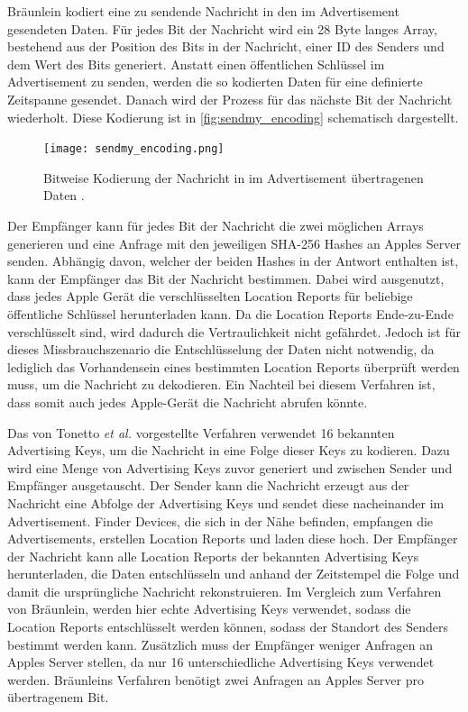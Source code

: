 Bräunlein \cite{braeunlein_sendmy} kodiert eine zu sendende Nachricht in den im Advertisement gesendeten Daten.
Für jedes Bit der Nachricht wird ein 28 Byte langes Array, bestehend aus der Position des Bits in der Nachricht, einer ID des Senders und dem Wert des Bits generiert.
Anstatt einen öffentlichen Schlüssel im Advertisement zu senden, werden die so kodierten Daten für eine definierte Zeitspanne gesendet.
Danach wird der Prozess für das nächste Bit der Nachricht wiederholt.
Diese Kodierung ist in \autoref{fig:sendmy_encoding} schematisch dargestellt.
\begin{figure}[ht]
  \centering
  \texttt{[image: sendmy\_encoding.png]}
  \caption{Bitweise Kodierung der Nachricht in im Advertisement übertragenen Daten \cite{braeunlein_sendmy}.}
  \label{fig:sendmy_encoding}
\end{figure}
Der Empfänger kann für jedes Bit der Nachricht die zwei möglichen Arrays generieren und eine Anfrage mit den jeweiligen \ac{SHA}-256 Hashes an Apples Server senden.
Abhängig davon, welcher der beiden Hashes in der Antwort enthalten ist, kann der Empfänger das Bit der Nachricht bestimmen.
Dabei wird ausgenutzt, dass jedes Apple Gerät die verschlüsselten Location Reports für beliebige öffentliche Schlüssel herunterladen kann.
Da die Location Reports Ende-zu-Ende verschlüsselt sind, wird dadurch die Vertraulichkeit nicht gefährdet.
Jedoch ist für dieses Missbrauchszenario die Entschlüsselung der Daten nicht notwendig, da lediglich das Vorhandensein eines bestimmten Location Reports überprüft werden muss, um die Nachricht zu dekodieren.
Ein Nachteil bei diesem Verfahren ist, dass somit auch jedes Apple-Gerät die Nachricht abrufen könnte.


Das von Tonetto \textit{et al.} \cite{Tonetto_FindMy} vorgestellte Verfahren verwendet 16 bekannten Advertising Keys, um die Nachricht in eine Folge dieser Keys zu kodieren.
Dazu wird eine Menge von Advertising Keys zuvor generiert und zwischen Sender und Empfänger ausgetauscht.
Der Sender kann die Nachricht erzeugt aus der Nachricht eine Abfolge der Advertising Keys und sendet diese nacheinander im Advertisement.
Finder Devices, die sich in der Nähe befinden, empfangen die Advertisements, erstellen Location Reports und laden diese hoch.
Der Empfänger der Nachricht kann alle Location Reports der bekannten Advertising Keys herunterladen, die Daten entschlüsseln und anhand der Zeitstempel die Folge und damit die ursprüngliche Nachricht rekonstruieren.
Im Vergleich zum Verfahren von Bräunlein, werden hier echte Advertising Keys verwendet, sodass die Location Reports entschlüsselt werden können, sodass der Standort des Senders bestimmt werden kann.
Zusätzlich muss der Empfänger weniger Anfragen an Apples Server stellen, da nur 16 unterschiedliche Advertising Keys verwendet werden.
Bräunleins Verfahren benötigt zwei Anfragen an Apples Server pro übertragenem Bit.


